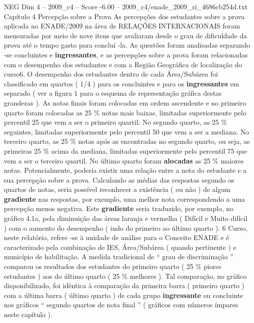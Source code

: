\begin{textsample}{NEG Dim 4 – 2009\_c4 – Score -6.00 – 2009\_c4/enade\_2009\_ri\_4686cb254d.txt}  \label{ex:f4_neg_027}
Capítulo 4 Percepção sobre a Prova As percepções dos estudantes sobre a prova aplicada no ENADE/2009 na área de RELAÇÕES INTERNACIONAIS foram mensuradas por meio de nove itens que avaliaram desde o grau de dificuldade da prova até o tempo gasto para concluí -la.
As questões foram analisadas separando -se concluintes e \textbf{ingressantes}, e as percepções sobre a prova foram relacionadas com o desempenho dos estudantes e com a Região Geográfica de localização do curso6.
O desempenho dos estudantes dentro de cada Área/Subárea foi classificado em quartos ( 1/4 ) para os concluintes e para os \textbf{ingressantes} em separado ( ver a figura 1 para o esquema de representação gráfica destas grandezas ).
As notas finais foram colocadas em ordem ascendente e no primeiro quarto foram colocadas as 25 \% notas mais baixas, limitadas superiormente pelo percentil 25 que vem a ser o primeiro quartil.
No segundo quarto, as 25 \% seguintes, limitadas superiormente pelo percentil 50 que vem a ser a mediana.
No terceiro quarto, as 25 \% notas após as encontradas no segundo quarto, ou seja, as primeiras 25 \% acima da mediana, limitadas superiormente pelo percentil 75 que vem a ser o terceiro quartil.
No último quarto foram \textbf{alocadas} as 25 \% maiores notas.
Potencialmente, poderia existir uma relação entre a nota do estudante e a sua percepção sobre a prova.
Calculando as médias das respostas segundo os quartos de notas, seria possível reconhecer a existência ( ou não ) de algum \textbf{gradiente} nas respostas, por exemplo, uma melhor nota correspondendo a uma percepção menos negativa.
Este \textbf{gradiente} seria traduzido, por exemplo, no gráfico 4.1a, pela diminuição das áreas laranja e vermelha ( Difícil e Muito difícil ) com o aumento do desempenho ( indo do primeiro ao último quarto ). 6 Curso, neste relatório, refere -se à unidade de análise para o Conceito ENADE e é caracterizado pela combinação de IES, Área/Subárea ( quando pertinente ) e município de habilitação.
A medida tradicional de “ grau de discriminação ” comparou os resultados dos estudantes do primeiro quarto ( 25 \% piores estudantes ) aos do último quarto ( 25 \% melhores ).
Tal comparação, no gráfico disponibilizado, foi idêntica à comparação da primeira barra ( primeiro quarto ) com a última barra ( último quarto ) de cada grupo \textbf{ingressante} ou concluinte nos gráficos “ segundo quartos de nota final ” ( gráficos com números ímpares neste capítulo ).

\end{textsample}
